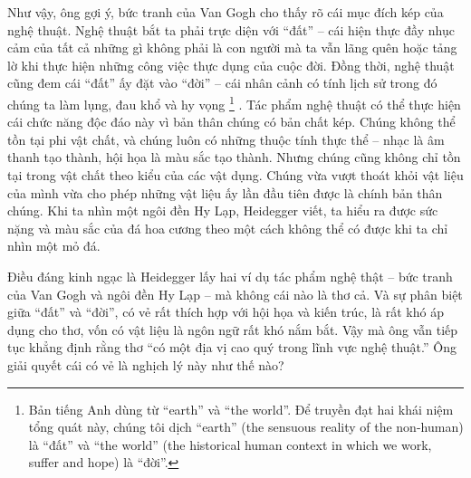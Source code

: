 \documentclass[../main.tex]{subfiles}
\begin{document}
\begin{multicols}{2}
Như vậy, ông gợi ý, bức tranh của Van Gogh cho thấy rõ cái mục đích kép của nghệ thuật. Nghệ thuật bắt ta phải trực diện với “đất” – cái hiện thực đầy nhục cảm của tất cả những gì không phải là con người mà ta vẫn lãng quên hoặc tảng lờ khi thực hiện những công việc thực dụng của cuộc đời. Đồng thời, nghệ thuật cũng đem cái “đất” ấy đặt vào “đời” – cái nhân cảnh có tính lịch sử trong đó chúng ta làm lụng, đau khổ và hy vọng \footnote{
Bản tiếng Anh dùng từ “earth” và “the world”. Để truyền đạt hai khái niệm tổng quát này, chúng tôi dịch “earth” (the sensuous reality of the non-human) là “đất” và “the world” (the historical human context in which we work, suffer and hope) là “đời”.} . Tác phẩm nghệ thuật có thể thực hiện cái chức năng độc đáo này vì bản thân chúng có bản chất kép. Chúng không thể tồn tại phi vật chất, và chúng luôn có những thuộc tính thực thể – nhạc là âm thanh tạo thành, hội họa là màu sắc tạo thành. Nhưng chúng cũng không chỉ tồn tại trong vật chất theo kiểu của các vật dụng. Chúng vừa vượt thoát khỏi vật liệu của mình vừa cho phép những vật liệu ấy lần đầu tiên được là chính bản thân chúng. Khi ta nhìn một ngôi đền Hy Lạp, Heidegger viết, ta hiểu ra được sức nặng và màu sắc của đá hoa cương theo một cách không thể có được khi ta chỉ nhìn một mỏ đá. 

Điều đáng kinh ngạc là Heidegger lấy hai ví dụ tác phẩm nghệ thật – bức tranh của Van Gogh và ngôi đền Hy Lạp – mà không cái nào là thơ cả. Và sự phân biệt giữa “đất” và “đời”, có vẻ rất thích hợp với hội họa và kiến trúc, là rất khó áp dụng cho thơ, vốn có vật liệu là ngôn ngữ rất khó nắm bắt. Vậy mà ông vẫn tiếp tục khẳng định rằng thơ “có một địa vị cao quý trong lĩnh vực nghệ thuật.” Ông giải quyết cái có vẻ là nghịch lý này như thế nào? 


\end{multicols}
\end{document}
